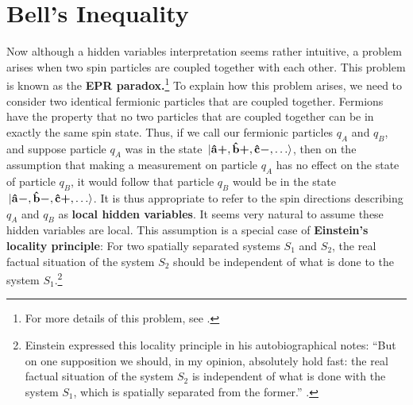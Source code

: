  
      \section{Bell's Inequality}\label{BellSection}
      Now although a hidden variables interpretation seems rather intuitive, a problem arises when two spin particles are coupled together with each other. This problem is known as the \textbf{EPR paradox.}\footnote{For more details of this problem, see \cite[241-249]{Sakurai}.} To explain how this problem arises, we need to consider two identical fermionic particles that are coupled together. Fermions have the property that no two particles that are coupled together can be in exactly the same spin state. Thus, if we call our fermionic particles $q_A$ and $q_B$, and suppose particle $q_A$ was in the state $\ket*{\vb{\hat{{a}}}\bm{+},\vb{\hat{{b}}}\bm{+},\vb{\hat{{c}}}\bm{-},\ldots}$, then on the assumption that making a measurement on particle $q_A$ has no effect on the state of particle $q_B$, it would follow that particle $q_B$ would be in the  state  $\ket*{\vb{\hat{{a}}}\bm{-},\vb{\hat{{b}}}\bm{-},\vb{\hat{{c}}}\bm{+},\ldots}$. It is thus appropriate to refer to the spin directions describing $q_A$ and $q_B$ as \textbf{local hidden variables}. It seems very natural to assume these  hidden variables are local. This assumption is a special case of \textbf{Einstein's locality principle}: For two spatially separated systems $S_1$ and $S_2$,  the real factual situation of the system $S_2$ should be independent of what is done to the system $S_1$.\footnote{Einstein expressed this locality principle in his autobiographical notes: ``But on one supposition we should, in my opinion, absolutely hold fast: the real factual situation of the system $S_2$ is independent of what is done with the system $S_1$, which is spatially separated from the former.'' \cite[p. 85]{EinsteinLocality}.} 
       
